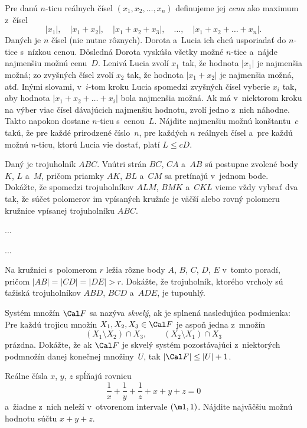 {%
Pre danú $n$-ticu reálnych čísel $(x_1,x_2,\dots,x_n)$ definujeme jej {\it cenu\/} ako maximum z~čísel
$$
|x_1|,\quad |x_1+x_2|,\quad |x_1+x_2+x_3|,\quad\dots,\quad|x_1+x_2+\dots+x_n|.
$$
Daných je $n$ čísel (nie nutne rôznych). Dorota a~Lucia ich chcú usporiadať do $n$-tice s~nízkou cenou. Dôsledná Dorota vyskúša všetky možné $n$-tice a~nájde najmenšiu možnú cenu~$D$. Lenivá Lucia zvolí $x_1$ tak, že hodnota $|x_1|$ je najmenšia možná; zo zvyšných čísel zvolí $x_2$ tak, že hodnota $|x_1+x_2|$ je najmenšia možná, atď. Inými slovami, v~$i$-tom kroku Lucia spomedzi zvyšných čísel vyberie $x_i$ tak, aby hodnota $|x_1+x_2+\dots+x_i|$ bola najmenšia možná. Ak má v~niektorom kroku na výber viac čísel dávajúcich najmenšiu hodnotu, zvolí jedno z~nich náhodne. Takto napokon dostane $n$-ticu s~cenou~$L$. Nájdite najmenšiu možnú konštantu~$c$ takú, že pre každé prirodzené číslo~$n$, pre každých $n$ reálnych čísel a~pre každú možnú $n$-ticu, ktorú Lucia vie dostať, platí $L\le cD$.
}

{%
Daný je trojuholník $ABC$. Vnútri strán $BC$, $CA$ a~$AB$ sú postupne zvolené body $K$, $L$ a~$M$, pričom priamky $AK$, $BL$ a~$CM$ sa pretínajú v~jednom bode. Dokážte, že spomedzi trojuholníkov $ALM$, $BMK$ a~$CKL$ vieme vždy vybrať dva tak, že súčet polomerov im vpísaných kružníc je väčší alebo rovný polomeru kružnice vpísanej trojuholníku $ABC$.
}

{%
...}

{%
...}

{%
Na kružnici s~polomerom $r$ ležia rôzne body $A$, $B$, $C$, $D$, $E$ v~tomto poradí, pričom $|AB|=|CD|=|DE|>r$. Dokážte, že trojuholník, ktorého vrcholy sú ťažiská trojuholníkov $ABD$, $BCD$ a~$ADE$, je tupouhlý.}

{%
Systém množín $\Cal F$ sa nazýva {\it skvelý\/}, ak je splnená nasledujúca podmienka: Pre každú trojicu množín $X_1,X_2,X_3\in\Cal F$ je aspoň jedna z~množín
$$
(X_1\setminus X_2) \cap X_3,\qquad (X_2\setminus X_1)\cap X_3
$$
prázdna. Dokážte, že ak $\Cal F$ je skvelý systém pozostávajúci z~niektorých podmnožín danej konečnej množiny~$U$, tak ${|\Cal F|\le|U|+1}$.
}

{%
Reálne čísla $x$, $y$, $z$ spĺňajú rovnicu
$$
\frac{1}{x}+\frac{1}{y}+\frac{1}{z}+x+y+z=0
$$
a~žiadne z~nich neleží v~otvorenom intervale $(\m1,1)$. Nájdite najväčšiu možnú hodnotu súčtu $x+y+z$.}

